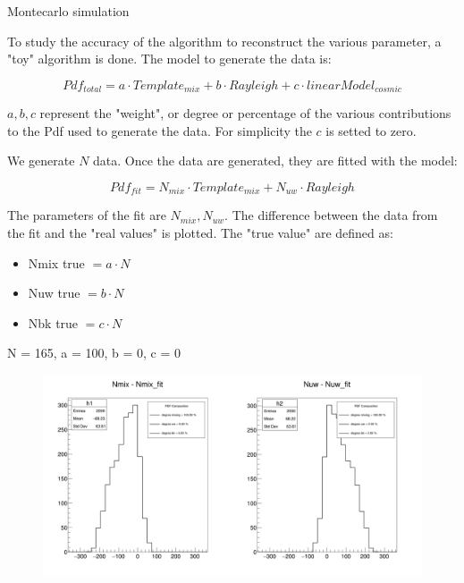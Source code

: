 \documentclass[10pt]{beamer}
\begin{document}
\begin{frame}{Montecarlo simulation}

To study the accuracy of the algorithm to reconstruct the various parameter, a "toy" algorithm is done. The model to generate the data is:

\begin{equation}
Pdf_{total} = a \cdot Template_{mix} + b \cdot Rayleigh + c \cdot linearModel_{cosmic} 
\end{equation}

$a,b,c$ represent the "weight", or degree or percentage of the various contributions to the Pdf used to generate the data. For simplicity the $c$ is setted to zero. 

We generate $N$ data. Once the data are generated, they are fitted with the model:

\begin{equation}
Pdf_{fit} = N_{mix} \cdot Template_{mix} + N_{uw} \cdot Rayleigh
\end{equation}

The parameters of the fit are $N_{mix}, N_{uw}$. The difference between the data from the fit and the "real values" is plotted. The "true value" are defined as:


\begin{itemize}
\centering
\item Nmix true $= a \cdot N$
\item Nuw true  $= b \cdot N$
\item Nbk true  $= c \cdot N$
\end{itemize} 

\end{frame}

\begin{frame} {N = 165, a = 100, b = 0, c = 0}

\begin{figure}
\includegraphics[width = 1\textwidth]{Nequalto164/toy(100,0,0).png} 
\end{figure}

\end{frame}
\end{document}
